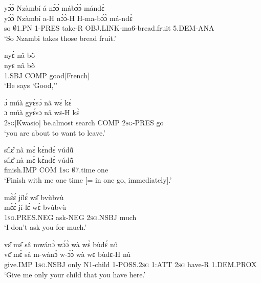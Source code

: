 \begin{exe} 
\exN\label{58}
  \glll yɔ́ɔ̀ Nzàmbí á nɔ̀ɔ́ mábɔ́ɔ̀ mándɛ̀\\
         yɔ́ɔ̀ Nzàmbí a-H nɔ̀ɔ̀-H H-ma-bɔ́ɔ̀ má-ndɛ̀\\
          so $\emptyset$1.PN 1-PRES take-R OBJ.LINK-ma6-bread.fruit 5.DEM-ANA\\
    \trans `So Nzambi takes those bread fruit.'
\end{exe}

\begin{exe} 
\exN\label{59}
  \glll nyɛ̀ nâ bõ̀ \\
       nyɛ nâ bõ̀ \\
          1.SBJ COMP good[French]  \\
    \trans `He says `Good,''
\end{exe}

\begin{exe} 
\exN\label{60}
  \glll ɔ̀ múà gyɛ́sɔ̀ nâ wɛ́ kɛ̀ \\
       ɔ múà gyɛ́sɔ nâ wɛ-H kɛ̀ \\
         2\textsc{sg}[Kwasio] be.almost search COMP 2\textsc{sg}-PRES go   \\
    \trans `you are about to want to leave.'
\end{exe}

\begin{exe} 
\exN\label{61}
  \glll sílɛ̂ nà mɛ̀ kɛ̀ndɛ̀ vúdũ̂ \\
         sílɛ̂ nà mɛ̀ kɛ̀ndɛ̀ vúdũ̂ \\
         finish.IMP COM 1\textsc{sg} $\emptyset$7.time one   \\
    \trans `Finish with me one time [= in one go, immediately].'
\end{exe}

\begin{exe} 
\exN\label{62}
  \glll mɛ̀ɛ́ jílɛ́ wɛ̂ bvùbvù \\
       mɛ̀ɛ́ jí-lɛ́ wɛ̀ bvùbvù \\
         1\textsc{sg}.PRES.NEG ask-NEG 2\textsc{sg}.NSBJ much \\
    \trans `I don't ask you for much.'
\end{exe}

\begin{exe} 
\exN\label{63}
  \glll  vɛ̂ mɛ̂ sâ mwánɔ̀ wɔ́ɔ̀ wà wɛ̀ bùdɛ́ nû\\
         vɛ̂ mɛ̀ sâ m-wánɔ̀ w-ɔ́ɔ̀ wà wɛ bùdɛ-H nû\\
          give.IMP 1\textsc{sg}.NSBJ only N1-child 1-POSS.2\textsc{sg} 1:ATT 2\textsc{sg} have-R 1.DEM.PROX\\
    \trans `Give me only your child that you have here.'
\end{exe}

